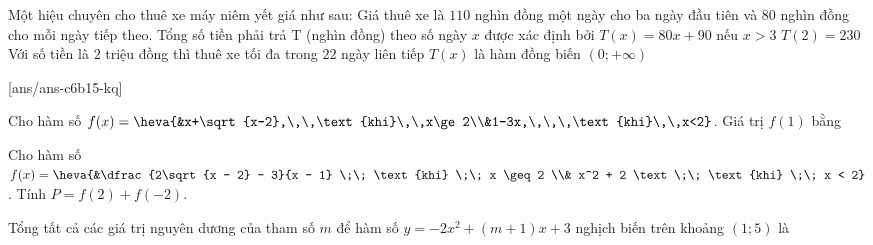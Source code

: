 \begin{ex}%
	Một hiệu chuyên cho thuê xe máy niêm yết giá như sau: Giá thuê xe là $110$ nghìn đồng một ngày cho ba ngày đầu tiên và $80$ nghìn đồng cho mỗi ngày tiếp theo.
	\choiceTF
	{\True Tổng số tiền phải trả T (nghìn đồng) theo số ngày $x$ được xác định bởi $T(x)=80x+90$ nếu $x>3$}
	{$T(2)=230$}
	{\True Với số tiền là $2$ triệu đồng thì thuê xe tối đa trong $22$ ngày liên tiếp}
	{$T(x)$ là hàm đồng biến $\left(0;+\infty\right)$}
\end{ex}
 
\setcounter{ex}{0}
[ans/ans-c6b15-kq]
\begin{ex}%
	Cho hàm số $f(x)=\heva{&x+\sqrt{x-2},\,\,\text{khi}\,\,x\ge 2\\&1-3x,\,\,\,\text{khi}\,\,x<2}$. Giá trị $f(1)$ bằng
	\par{}
\end{ex}
\begin{ex}%
	Cho hàm số $f(x) = \heva{&\dfrac{2\sqrt{x - 2} - 3}{x - 1} \;\; \text{khi} \;\; x \geq 2 \\& x^2 + 2 \text  \;\; \text{khi} \;\; x < 2}$. Tính $P = f(2) + f(-2)$.
	\par{}
\end{ex}
\begin{ex}%
	Tổng tất cả các giá trị nguyên dương của tham số $m$ để hàm số $y=-2 x^2+(m+1) x+3$ nghịch biến trên khoảng $(1 ; 5)$ là
	\par{}
\end{ex}
